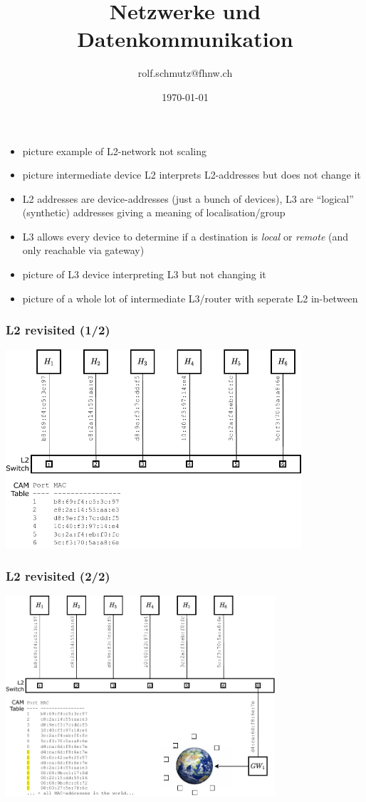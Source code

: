 \documentclass{beamer}
\date{\today}
\author{rolf.schmutz@fhnw.ch}
\institute{FHNW}
\title {Netzwerke und Datenkommunikation}
\begin{document}

\begin{frame}
\begin{tiny}
\begin{itemize}
  \item picture example of L2-network not scaling
  \item picture intermediate device L2 interprets L2-addresses but does not change it
  \item L2 addresses are device-addresses (just a bunch of devices), L3 are ``logical'' (synthetic) addresses giving a meaning of localisation/group
  \item L3 allows every device to determine if a destination is {\em local} or {\em remote} (and only reachable via gateway)
  \item picture of L3 device interpreting L3 but not changing it
  \item picture of a whole lot of intermediate L3/router with seperate L2 in-between
\end{itemize}
\end{tiny}
\end{frame}

\begin{frame}
\frametitle{L2 revisited (1/2)}
\includegraphics[width=11cm]{L2-base-network.pdf}
\end{frame}

\begin{frame}
\frametitle{L2 revisited (2/2)}
\includegraphics[width=10cm]{L2-base-network-L2-gateway.pdf}
\end{frame}
\end{document}

